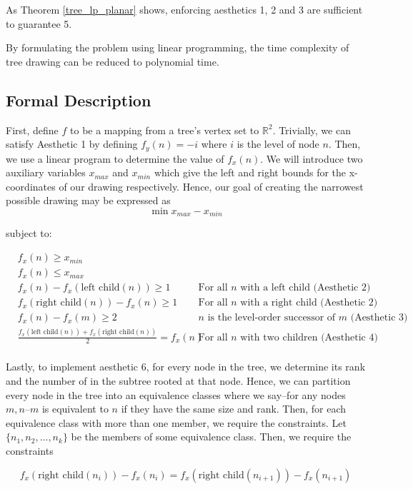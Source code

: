 \documentclass[11pt]{report}
\newcommand{\leftc}[1]{\text{left child}\left(#1\right)}
\newcommand{\rightc}[1]{\text{right child}\left(#1\right)}
\begin{document}
As Theorem \ref{tree_lp_planar} shows, enforcing aesthetics 1, 2 and 3 are sufficient to guarantee 5.

\bigskip

By formulating the problem using linear programming, the time complexity of tree drawing can be reduced to polynomial time.\cite{supowit1983complexity}

\subsection{Formal Description}
First, define $f$ to be a mapping from a tree's vertex set to $\mathbb{R}^2$. Trivially, we can satisfy Aesthetic 1 by defining $f_y(n) = -i$ where $i$ is the level of node $n$. Then, we use a linear program to determine the value of $f_x(n)$. We will introduce two auxiliary variables $x_{max}$ and $x_{min}$ which give the left and right bounds for the x-coordinates of our drawing respectively. Hence, our goal of creating the narrowest possible drawing may be expressed as 
\[
\min{x_{max} - x_{min}}
\]

subject to:

\[
\begin{aligned}
    &f_x(n) \geq x_{min} \\
    &f_x(n) \leq x_{max} \\
    &f_x(n) - f_x( \leftc{n} ) \geq 1 &\text{For all $n$ with a left child (Aesthetic 2)} \\
    &f_x( \rightc{n} ) - f_x(n) \geq 1 &\text{For all $n$ with a right child (Aesthetic 2)} \\
    &f_x(n) - f_x(m) \geq 2 &\text{$n$ is the level-order successor of $m$ (Aesthetic 3)} \\
    &\frac{ f_x(\leftc{n}) + f_x(\rightc{n}) }{2} = f_x(n)
         &\text{For all $n$ with two children (Aesthetic 4)} \\
\end{aligned}
\]

Lastly, to implement aesthetic 6, for every node in the tree, we determine its rank and the number of in the subtree rooted at that node. Hence, we can partition every node in the tree into an equivalence classes where we say--for any nodes $m, n$--$m$ is equivalent to $n$ if they have the same size and rank. Then, for each equivalence class with more than one member, we require the constraints. Let $\{ n_1, n_2, ..., n_k \}$ be the members of some equivalence class. Then, we require the constraints

\begin{equation}
    f_x( \rightc{n_i} ) - f_x(n_i) = f_x( \rightc{n_{i + 1}} ) - f_x( n_{i + 1} )
\end{equation}
\end{document}
